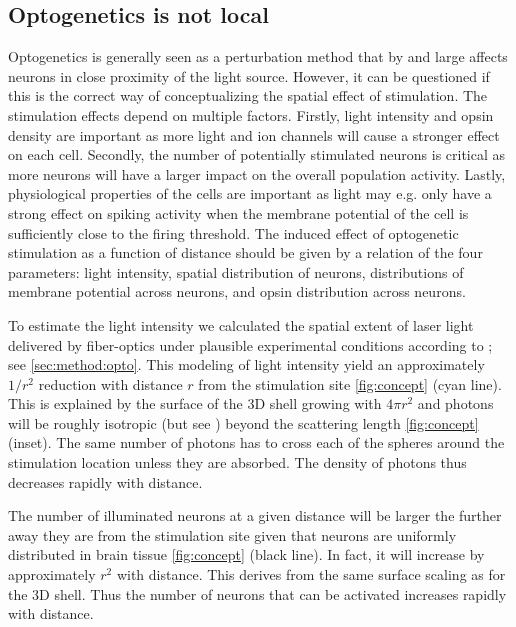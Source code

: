 \documentclass[11pt]{article}
\begin{document}
\subsection{Optogenetics is not local}
Optogenetics is generally seen as a perturbation method that by and large affects neurons in close proximity of the light source. However, it can be questioned if this is the correct way of conceptualizing the spatial effect of stimulation. The stimulation effects depend on multiple factors. Firstly, light intensity and opsin density are important as more light and ion channels will cause a stronger effect on each cell. Secondly, the number of potentially stimulated neurons is critical as more neurons will have a larger impact on the overall population activity. Lastly, physiological properties of the cells are important as light may e.g. only have a strong effect on spiking activity when the membrane potential of the cell is sufficiently close to the firing threshold. The induced effect of optogenetic stimulation as a function of distance should be given by a relation of the four parameters: light intensity, spatial distribution of neurons, distributions of membrane potential across neurons, and opsin distribution across neurons.

To estimate the light intensity we calculated the spatial extent of laser light delivered by fiber-optics under plausible experimental conditions according to \citet{Aravanis2007}; see \cref{sec:method:opto}. This modeling of light intensity yield an approximately $ 1/r^2 $ reduction with distance $ r $ from the stimulation site \cref{fig:concept} (cyan line). This is explained by the surface of the 3D shell growing with $4\pi r^2$ and photons will be roughly isotropic (but see \citep{thunemann2018does}) beyond the scattering length \cref{fig:concept} (inset). The same number of photons has to cross each of the spheres around the stimulation location unless they are absorbed. The density of photons thus decreases rapidly with distance.

The number of illuminated neurons at a given distance will be larger the further away they are from the stimulation site given that neurons are uniformly distributed in brain tissue \cref{fig:concept} (black line). In fact, it will increase by approximately $ r^2 $ with distance. This derives from the same surface scaling as for the 3D shell. Thus the number of neurons that can be activated increases rapidly with distance.
\end{document}
